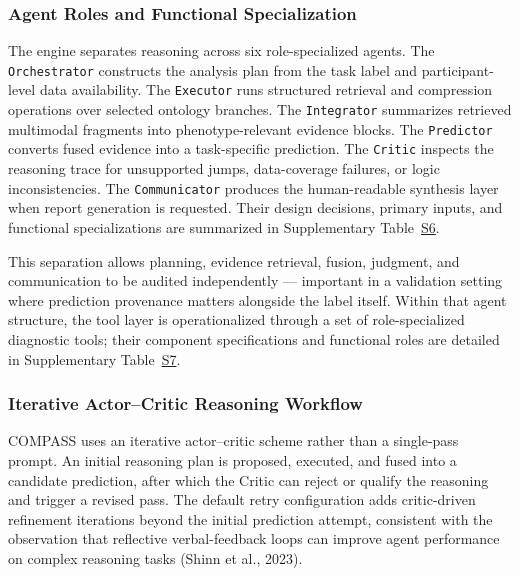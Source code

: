 \documentclass[11pt,a4paper,twoside]{article}
\begin{document}
\subsubsection{Agent Roles and Functional Specialization}
The engine separates reasoning across six role-specialized agents. The \texttt{Orchestrator} constructs the analysis plan from the task label and participant-level data availability. The \texttt{Executor} runs structured retrieval and compression operations over selected ontology branches. The \texttt{Integrator} summarizes retrieved multimodal fragments into phenotype-relevant evidence blocks. The \texttt{Predictor} converts fused evidence into a task-specific prediction. The \texttt{Critic} inspects the reasoning trace for unsupported jumps, data-coverage failures, or logic inconsistencies. The \texttt{Communicator} produces the human-readable synthesis layer when report generation is requested. Their design decisions, primary inputs, and functional specializations are summarized in Supplementary Table~\hyperref[tab:s6]{S6}.

This separation allows planning, evidence retrieval, fusion, judgment, and communication to be audited independently --- important in a validation setting where prediction provenance matters alongside the label itself. Within that agent structure, the tool layer is operationalized through a set of role-specialized diagnostic tools; their component specifications and functional roles are detailed in Supplementary Table~\hyperref[tab:s7]{S7}.

\subsubsection{Iterative Actor--Critic Reasoning Workflow}
COMPASS uses an iterative actor--critic scheme rather than a single-pass prompt. An initial reasoning plan is proposed, executed, and fused into a candidate prediction, after which the Critic can reject or qualify the reasoning and trigger a revised pass. The default retry configuration adds critic-driven refinement iterations beyond the initial prediction attempt, consistent with the observation that reflective verbal-feedback loops can improve agent performance on complex reasoning tasks (Shinn et al., 2023).
\end{document}

